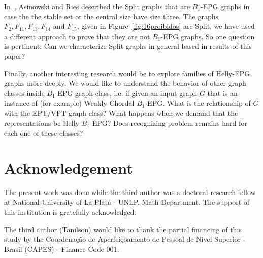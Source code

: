 \documentclass{dmgt}
\begin{document}
 

In~\cite{ries2009}, Asinowski and Ries described the   Split graphs that are $B_1$-EPG graphs in case the the stable set  or the  central  size have size three. 
The graphs $F_2, F_{11}, F_{13}, F_{14}$ and $F_{15}$, given in Figure~\ref{fig:16proibidos} are Split, we have  used a different approach  to prove that they are not $B_1$-EPG graphs. So one question is pertinent: Can we characterize Split graphs in general based in results of this paper? 

Finally, another interesting research would be to explore families of Helly-EPG graphs more deeply. We would like to understand the behavior of other graph classes inside $B_1$-EPG graph class, i.e. if given an  input graph $G$ that is an instance of (for example) Weakly Chordal $B_1$-EPG. What is the relationship of $G$ with the EPT/VPT graph class? What happens when we demand that the representations be Helly-$B_1$ EPG? Does  recognizing problem remains hard for each one of these classes?


\section*{Acknowledgement}

The present work was done while the third author was a doctoral research fellow at National University of La Plata - UNLP, Math Department. The support of this institution is gratefully acknowledged.

The third author (Tanilson) would like to thank the partial financing of this study by the Coordena{\c c}\~ao de Aperfei{\c c}oamento de Pessoal de N\'ivel Superior - Brasil (CAPES) - Finance Code 001.
\end{document}
